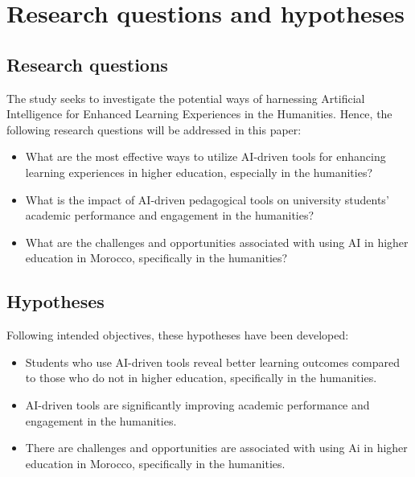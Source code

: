 \section{Research questions and hypotheses}\label{sec:research-questions-and-hypotheses}

\subsection{Research questions}\label{subsec:research-questions}
\justifying
The study seeks to investigate the potential ways
of harnessing Artificial Intelligence for
Enhanced Learning Experiences in the Humanities.
Hence,
the following research questions will be addressed in this paper:
\begin{itemize}
    \item What are the most effective ways to utilize AI-driven
    tools for enhancing learning experiences in higher education, 
    especially in the humanities?
    \item What is the impact of AI-driven pedagogical tools 
    on university students' academic performance 
    and engagement in the humanities?
    \item What are the challenges and opportunities associated 
    with using AI in higher education in Morocco, 
    specifically in the humanities?
\end{itemize}
\subsection{Hypotheses}\label{subsec:hypotheses}
\justifying
Following intended objectives, these hypotheses have been developed:
\begin{itemize}
    \item Students who use AI-driven tools reveal better learning outcomes
    compared to those who do not in higher education, specifically in the humanities.
    \item AI-driven tools are significantly improving academic
    performance and engagement in the humanities.
    \item There are challenges and opportunities are associated with using Ai in higher
    education in Morocco, specifically in the humanities.
\end{itemize}



